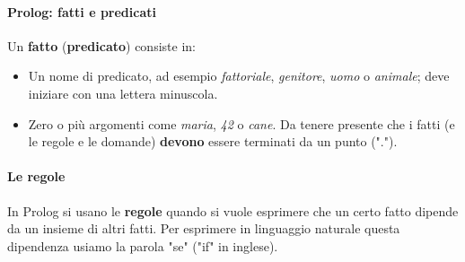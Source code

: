 \documentclass[11pt]{article}
\begin{document}
\paragraph{Prolog: fatti e predicati}

Un \textbf{fatto} (\textbf{predicato}) consiste in:
\begin{itemize}
	\item Un nome di predicato, ad esempio \textit{fattoriale}, \textit{genitore}, \textit{uomo} o \textit{animale}; deve iniziare con una lettera \color{red} minuscola\color{black}.
	\item Zero o più argomenti come \textit{maria}, \textit{42} o \textit{cane}. Da tenere presente che i fatti (e le regole e le domande) \textbf{devono} essere terminati da un punto (".").
\end{itemize}

\paragraph{Le regole} In Prolog si usano le \textbf{regole} quando si vuole esprimere che un certo fatto dipende da un insieme di altri fatti. Per esprimere in linguaggio naturale questa dipendenza usiamo la parola "\color{blue}se\color{black}" ("if" in inglese).
\end{document}
